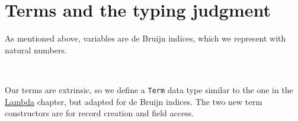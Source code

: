 \hypertarget{terms-and-the-typing-judgment}{%
\section{Terms and the typing
judgment}\label{terms-and-the-typing-judgment}}

As mentioned above, variables are de Bruijn indices, which we represent
with natural numbers.

\begin{fence}
\begin{code}%
\>[0]\AgdaSpace{}%
\AgdaSymbol{:}\AgdaSpace{}%
\<%
\\
\>[0]\AgdaSpace{}%
\AgdaSymbol{=}\AgdaSpace{}%
\<%
\end{code}
\end{fence}

Our terms are extrinsic, so we define a \texttt{Term} data type similar
to the one in the \protect\hyperlink{Lambda}{Lambda} chapter, but
adapted for de Bruijn indices. The two new term constructors are for
record creation and field access.


